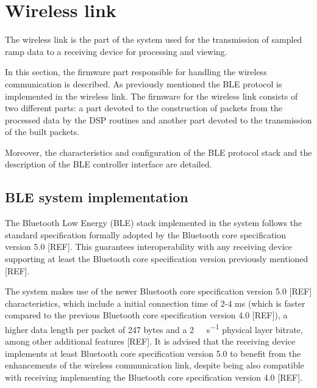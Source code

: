 \section{Wireless link} \label{sec:wireless_link}

The wireless link is the part of the system used for the transmission of sampled ramp data to a receiving device for processing and viewing.

In this section, the firmware part responsible for handling the wireless communication is described. As previously mentioned the BLE protocol is implemented in the wireless link. The firmware for the wireless link consists of two different parts: a part devoted to the construction of packets from the processed data by the DSP routines and another part devoted to the transmission of the built packets.

Moreover, the characteristics and configuration of the BLE protocol stack and the description of the BLE controller interface are detailed.

\subsection{BLE system implementation}


The Bluetooth Low Energy (BLE) stack implemented in the system follows the standard specification formally adopted by the Bluetooth core specification version 5.0 [REF]. This guarantees interoperability with any receiving device supporting at least the Bluetooth core specification version previously mentioned [REF].

The system makes use of the newer Bluetooth core specification version 5.0 [REF] characteristics, which include a initial connection time of 2-4 ms (which is faster compared to the previous Bluetooth core specification version 4.0 [REF]), a higher data length per packet of 247 bytes and a \SI{2}{\mega\bit\per\second} physical layer bitrate, among other additional features [REF]. It is advised that the receiving device implements at least Bluetooth core specification version 5.0 to benefit from the enhancements of the wireless communication link, despite being also compatible with receiving implementing the Bluetooth core specification version 4.0 [REF].

